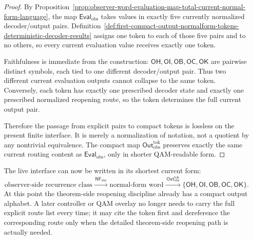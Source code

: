 \begin{proof}
By Proposition~\ref{prop:observer-word-evaluation-map-total-current-normal-form-language}, the map \(\mathsf{Eval}_{\mathrm{obs}}\) takes values in exactly five currently normalized decoder/output pairs. Definition~\ref{def:first-compact-output-normalform-tokens-deterministic-decoder-results} assigns one token to each of those five pairs and to no others, so every current evaluation value receives exactly one token.

Faithfulness is immediate from the construction: \(\mathsf{OH},\mathsf{OI},\mathsf{OB},\mathsf{OC},\mathsf{OK}\) are pairwise distinct symbols, each tied to one different decoder/output pair. Thus two different current evaluation outputs cannot collapse to the same token. Conversely, each token has exactly one prescribed decoder state and exactly one prescribed normalized reopening route, so the token determines the full current output pair.

Therefore the passage from explicit pairs to compact tokens is lossless on the present finite interface. It is merely a normalization of notation, not a quotient by any nontrivial equivalence. The compact map \(\mathsf{Out}^{\mathrm{tok}}_{\mathrm{obs}}\) preserves exactly the same current routing content as \(\mathsf{Eval}_{\mathrm{obs}}\), only in shorter QAM-readable form.
\end{proof}

\begin{remark}
\label{rem:why-compact-output-tokens-matter}
The live interface can now be written in its shortest current form:
\[
\text{observer-side recurrence class}
\xrightarrow{\ \mathsf{NF}_{\mathrm{obs}}\ }
\text{normal-form word}
\xrightarrow{\ \mathsf{Out}^{\mathrm{tok}}_{\mathrm{obs}}\ }
\{\mathsf{OH},\mathsf{OI},\mathsf{OB},\mathsf{OC},\mathsf{OK}\}.
\]
At this point the theorem-side reopening discipline already has a compact output alphabet. A later controller or QAM overlay no longer needs to carry the full explicit route list every time; it may cite the token first and dereference the corresponding route only when the detailed theorem-side reopening path is actually needed.
\end{remark}


